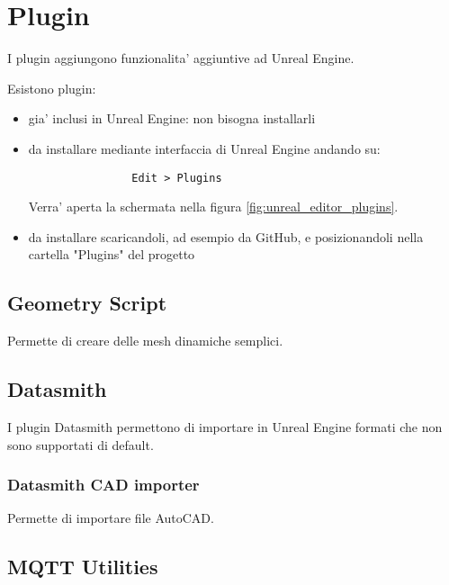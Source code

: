 
\chapter{Plugin}

    I plugin aggiungono funzionalita' aggiuntive ad Unreal Engine.

    Esistono plugin:
    \begin{itemize}
        \item gia' inclusi in Unreal Engine: non bisogna installarli
        \item da installare mediante interfaccia di Unreal Engine andando su:

            \begin{lstlisting}
                Edit > Plugins
            \end{lstlisting}

            Verra' aperta la schermata nella figura \ref{fig:unreal_editor_plugins}.

        \item da installare scaricandoli, ad esempio da GitHub, e posizionandoli nella cartella "Plugins" del progetto
    \end{itemize}


    \section{Geometry Script}

        Permette di creare delle mesh dinamiche semplici.


    \section{Datasmith}

        I plugin Datasmith permettono di importare in Unreal Engine formati che non sono supportati di default.

        \subsection{Datasmith CAD importer}

            Permette di importare file AutoCAD.


    \section{MQTT Utilities}

